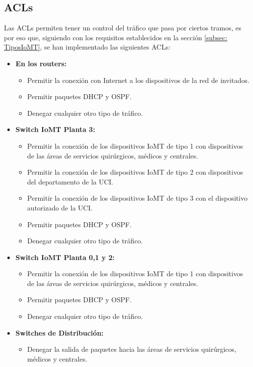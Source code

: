 \subsection{ACLs}
Las ACLs permiten tener un control del tráfico que pasa por ciertos tramos, es por eso que, siguiendo con los requisitos establecidos en la sección \ref{subsec: TiposIoMT}, se han implementado las siguientes ACLs:
\begin{itemize}
    \item \textbf{En los routers:} 
    \begin{itemize}
        \item Permitir la conexión con Internet a los dispositivos de la red de invitados.
        \item Permitir paquetes DHCP y OSPF.
        \item Denegar cualquier otro tipo de tráfico.
    \end{itemize}
    \item \textbf{Switch IoMT Planta 3:}
    \begin{itemize}
        \item Permitir la conexión de los dispositivos IoMT de tipo 1 con dispositivos de las áreas de servicios quirúrgicos, médicos y centrales.
        \item Permitir la conexión de los dispositivos IoMT de tipo 2 con dispositivos del departamento de la UCI.
        \item Permitir la conexión de los dispositivos IoMT de tipo 3 con el dispositivo autorizado de la UCI.
        \item Permitir paquetes DHCP y OSPF.
        \item Denegar cualquier otro tipo de tráfico.
    \end{itemize}
    \item \textbf{Switch IoMT Planta 0,1 y 2:}
    \begin{itemize}
        \item Permitir la conexión de los dispositivos IoMT de tipo 1 con dispositivos de las áreas de servicios quirúrgicos, médicos y centrales.
        \item Permitir paquetes DHCP y OSPF.
        \item Denegar cualquier otro tipo de tráfico.
    \end{itemize}
    \item \textbf{Switches de Distribución:}
    \begin{itemize}
        \item Denegar la salida de paquetes hacia las áreas de servicios quirúrgicos, médicos y centrales.

\end{itemize}
\end{itemize}
